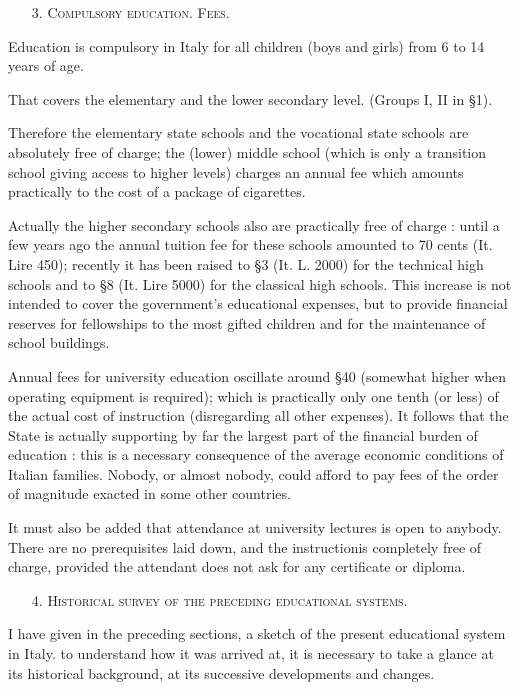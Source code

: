 \begin{itemize}
\item[3.] \textsc{Compulsory education. Fees.}
\end{itemize}

Education is compulsory in Italy for all children (boys and girls) from 6 to 14 years of age.

That covers the elementary and the lower secondary level. (Groups I, II in \S 1).

Therefore the elementary state schools and the vocational state schools are absolutely free of charge; the (lower) middle school (which is only a transition school giving access to higher levels) charges an annual fee which amounts practically to the cost of a package of cigarettes.

Actually the higher secondary schools also are practically free of charge : until a few years ago the annual tuition fee for these schools amounted to 70 cents (It. Lire 450); recently it has been raised to \S 3 (It. L. 2000) for the technical high schools and to \S 8 (It. Lire 5000) for the classical high schools. This increase is not intended to cover the government's educational expenses, but to provide financial reserves for fellowships to the most gifted children and for the maintenance of school buildings.

Annual fees for university education oscillate around \S 40 (somewhat higher when operating equipment is required); which is practically only one tenth (or less) of the actual cost of instruction (disregarding all other expenses). It follows that the State is actually supporting by far the largest part of the financial burden of education : this is a necessary consequence of the average economic conditions of Italian families. Nobody, or almost nobody, could afford to pay fees of the order of magnitude exacted in some other countries.

It must also be added that attendance at university lectures is open to anybody. There are no prerequisites laid down, and the instruction\pageoriginale is completely free of charge, provided the attendant does not ask for any certificate or diploma.

\begin{itemize}
\item[4.] \textsc{Historical survey of the preceding educational systems.}
\end{itemize}

I have given in the preceding sections, a sketch of the present educational system in Italy. to understand how it was arrived at, it is necessary to take a glance at its historical background, at its successive developments and changes.

